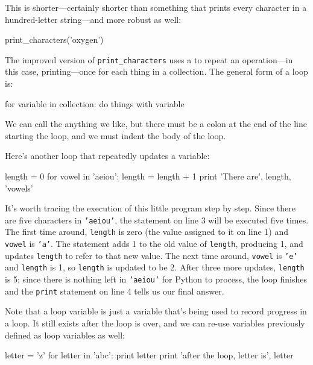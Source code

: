 \documentclass{book}
\begin{document}
This is shorter---certainly shorter than something that prints every
character in a hundred-letter string---and more robust as well:

\begin{VerbIn}
print_characters('oxygen')
\end{VerbIn}

The improved version of \texttt{print\_characters} uses a
 to repeat an operation---in this case,
printing---once for each thing in a collection. The general form of a
loop is:

\begin{VerbIn}
for variable in collection:
    do things with variable
\end{VerbIn}

We can call the  anything we
like, but there must be a colon at the end of the line starting the
loop, and we must indent the body of the loop.

Here's another loop that repeatedly updates a variable:

\begin{VerbIn}
length = 0
for vowel in 'aeiou':
    length = length + 1
print 'There are', length, 'vowels'
\end{VerbIn}

It's worth tracing the execution of this little program step by step.
Since there are five characters in \texttt{'aeiou'}, the statement on
line 3 will be executed five times. The first time around,
\texttt{length} is zero (the value assigned to it on line 1) and
\texttt{vowel} is \texttt{'a'}. The statement adds 1 to the old value of
\texttt{length}, producing 1, and updates \texttt{length} to refer to
that new value. The next time around, \texttt{vowel} is \texttt{'e'} and
\texttt{length} is 1, so \texttt{length} is updated to be 2. After three
more updates, \texttt{length} is 5; since there is nothing left in
\texttt{'aeiou'} for Python to process, the loop finishes and the
\texttt{print} statement on line 4 tells us our final answer.

Note that a loop variable is just a variable that's being used to record
progress in a loop. It still exists after the loop is over, and we can
re-use variables previously defined as loop variables as well:

\begin{VerbIn}
letter = 'z'
for letter in 'abc':
    print letter
print 'after the loop, letter is', letter
\end{VerbIn}
\end{document}
